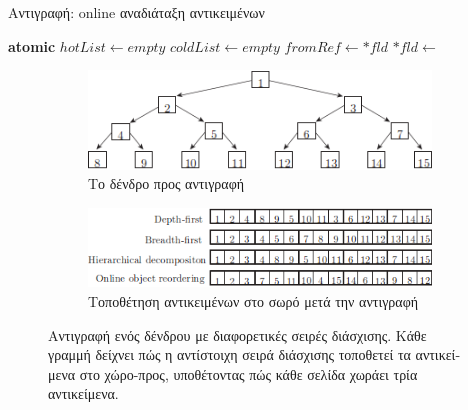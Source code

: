 \begin{greek}
\begin{algorithm}
  \caption{Αντιγραφή: online αναδιάταξη αντικειμένων}
  \label{alg:cop_5}
  \begin{algorithmic}[1]
      \State \textbf{atomic}
      \State {}
      \State {}
        \State {}
      \EndFor
      \Repeat
          \State {}
        \EndWhile
          \State {}
        \EndWhile
    \EndProcedure
    \Statex
      \State $hotList \gets empty$
      \State $coldList \gets empty$
    \EndProcedure
    \Statex
      \State $fromRef \gets *fld$
        \State $*fld \gets$ 
      \EndIf
    \EndProcedure
    \Statex
          \State {}
        \Else
          \State {}
        \EndIf
      \EndFor
    \EndProcedure
  \end{algorithmic}
\end{algorithm}

\begin{figure}[H]
  \centering
  \begin{subfigure}{1.0\textwidth}
    \includegraphics{figures/cop_3a}
    \caption{Το δένδρο προς αντιγραφή}
  \end{subfigure}

  \begin{subfigure}[b]{1.0\textwidth}
    \includegraphics{figures/cop_3b}
    \caption{Τοποθέτηση αντικειμένων στο σωρό μετά την αντιγραφή}
  \end{subfigure}
  \caption[Αντιγραφή ενός δένδρου με διαφορετικές σειρές διάσχισης.]
    {Αντιγραφή ενός δένδρου με διαφορετικές σειρές διάσχισης.
     Κάθε γραμμή δείχνει πώς η αντίστοιχη σειρά διάσχισης τοποθετεί
     τα αντικείμενα στο χώρο-προς, υποθέτοντας πώς κάθε σελίδα
     χωράει τρία αντικείμενα.}
  \label{fig:cop_3}
\end{figure}


\end{greek}
